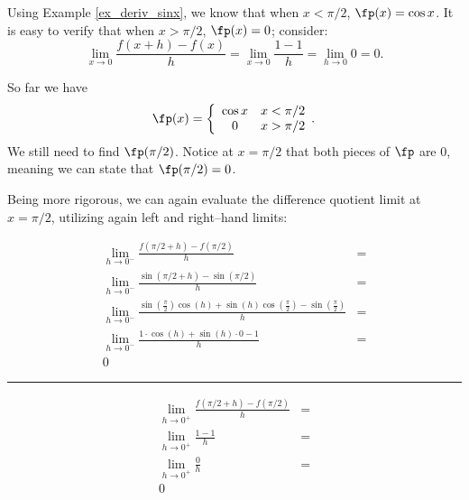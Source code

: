 {Using Example \ref{ex_deriv_sinx}, we know that when $x<\pi/2$, $\fp(x) = \cos x$. It is easy to verify that when $x>\pi/2$, $\fp(x) = 0$; consider:
			$$\lim_{x\to0}\frac{f(x+h) - f(x)}{h} = \lim_{x\to0}\frac{1-1}{h} = \lim_{h\to0}0 =0.$$
			
So far we have $$\fp(x) = \left\{\begin{array}{cc} \cos x & x<\pi/2\\ 0 & x>\pi/2\end{array}.\right.$$ We still need to find $\fp(\pi/2)$. Notice at $x=\pi/2$ that both pieces of $\fp$ are 0, meaning we can state that $\fp(\pi/2)=0$. 

Being more rigorous, we can again evaluate the difference quotient limit at $x=\pi/2$, utilizing again left and right--hand limits:\\

\small
\noindent\begin{minipage}{.6\linewidth}
\begin{align*}
\lim_{h\to0^-}\frac{f(\pi/2+h)-f(\pi/2)}{h} &=\\
\lim_{h\to0^-}\frac{\sin(\pi/2+h)-\sin(\pi/2)}{h}&=\\
\lim_{h\to0^-}{ \frac{\sin(\frac{\pi}{2})\cos(h)+\sin(h)\cos(\frac{\pi}{2})-\sin(\frac{\pi}{2})}{h}}&=\\
\lim_{h\to0^-}\frac{1\cdot\cos(h)+\sin(h)\cdot 0-1}{h} &=\\
0
\end{align*}
\end{minipage}
\begin{minipage}{1pt}
 \rule{.5pt}{100pt}
\end{minipage}
\begin{minipage}{.4\linewidth}
\begin{align*}
\lim_{h\to0^+}\frac{f(\pi/2+h)-f(\pi/2)}{h} &=\\
\lim_{h\to0^+}\frac{1-1}{h}&=\\
\lim_{h\to0^+}\frac{0}{h}&=\\
0&\\
\phantom{0}\\
\phantom{0}
\end{align*}
\end{minipage}
\normalsize

}
